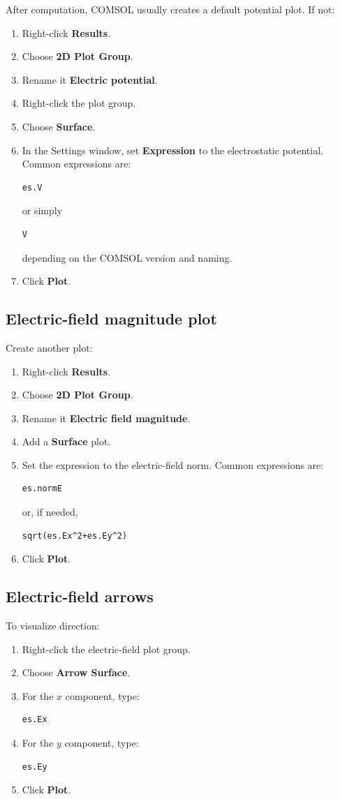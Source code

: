 \documentclass[11pt]{article}
\begin{document}
After computation, COMSOL usually creates a default potential plot. If not:
\begin{enumerate}[leftmargin=2em]
\item Right-click \textbf{Results}.
\item Choose \textbf{2D Plot Group}.
\item Rename it \textbf{Electric potential}.
\item Right-click the plot group.
\item Choose \textbf{Surface}.
\item In the Settings window, set \textbf{Expression} to the electrostatic potential. Common expressions are:
\begin{verbatim}
es.V
\end{verbatim}
or simply
\begin{verbatim}
V
\end{verbatim}
depending on the COMSOL version and naming.
\item Click \textbf{Plot}.
\end{enumerate}

\subsection{Electric-field magnitude plot}

Create another plot:
\begin{enumerate}[leftmargin=2em]
\item Right-click \textbf{Results}.
\item Choose \textbf{2D Plot Group}.
\item Rename it \textbf{Electric field magnitude}.
\item Add a \textbf{Surface} plot.
\item Set the expression to the electric-field norm. Common expressions are:
\begin{verbatim}
es.normE
\end{verbatim}
or, if needed,
\begin{verbatim}
sqrt(es.Ex^2+es.Ey^2)
\end{verbatim}
\item Click \textbf{Plot}.
\end{enumerate}

\subsection{Electric-field arrows}

To visualize direction:
\begin{enumerate}[leftmargin=2em]
\item Right-click the electric-field plot group.
\item Choose \textbf{Arrow Surface}.
\item For the $x$ component, type:
\begin{verbatim}
es.Ex
\end{verbatim}
\item For the $y$ component, type:
\begin{verbatim}
es.Ey
\end{verbatim}
\item Click \textbf{Plot}.
\end{enumerate}
\end{document}
